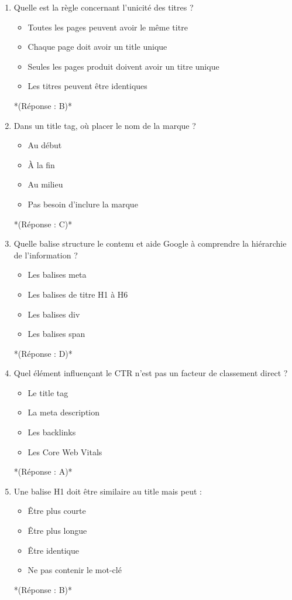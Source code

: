 \documentclass[12pt,a4paper,twoside]{report}
\begin{document}
\begin{enumerate}
\item Quelle est la règle concernant l'unicité des titres ?
\begin{itemize}
\item[A)] Toutes les pages peuvent avoir le même titre
\item[B)] Chaque page doit avoir un title unique
\item[C)] Seules les pages produit doivent avoir un titre unique
\item[D)] Les titres peuvent être identiques
\end{itemize}
*(Réponse : B)*

\item Dans un title tag, où placer le nom de la marque ?
\begin{itemize}
\item[A)] Au début
\item[B)] À la fin
\item[C)] Au milieu
\item[D)] Pas besoin d'inclure la marque
\end{itemize}
*(Réponse : C)*

\item Quelle balise structure le contenu et aide Google à comprendre la hiérarchie de l'information ?
\begin{itemize}
\item[A)] Les balises meta
\item[B)] Les balises de titre H1 à H6
\item[C)] Les balises div
\item[D)] Les balises span
\end{itemize}
*(Réponse : D)*

\item Quel élément influençant le CTR n'est pas un facteur de classement direct ?
\begin{itemize}
\item[A)] Le title tag
\item[B)] La meta description
\item[C)] Les backlinks
\item[D)] Les Core Web Vitals
\end{itemize}
*(Réponse : A)*

\item Une balise H1 doit être similaire au title mais peut :
\begin{itemize}
\item[A)] Être plus courte
\item[B)] Être plus longue
\item[C)] Être identique
\item[D)] Ne pas contenir le mot-clé
\end{itemize}
*(Réponse : B)*


\end{enumerate}
\end{document}
